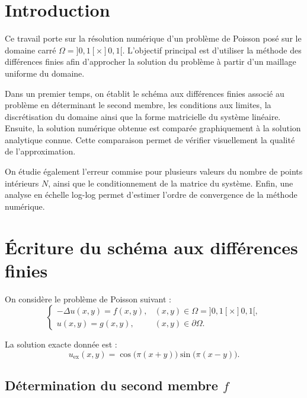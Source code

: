 \documentclass[12pt,a4paper]{article}
\begin{document}
	
	\tableofcontents
	\newpage
	
	\section*{Introduction}
	
	Ce travail porte sur la résolution numérique d'un problème de Poisson posé sur
	le domaine carré $\Omega=]0,1[\times]0,1[$. L'objectif principal est d'utiliser
	la méthode des différences finies afin d'approcher la solution du problème à
	partir d'un maillage uniforme du domaine.
	
	Dans un premier temps, on établit le schéma aux différences finies associé au
	problème en déterminant le second membre, les conditions aux limites, la
	discrétisation du domaine ainsi que la forme matricielle du système linéaire.
	Ensuite, la solution numérique obtenue est comparée graphiquement à la solution
	analytique connue. Cette comparaison permet de vérifier visuellement la qualité
	de l'approximation.
	
	On étudie également l'erreur commise pour plusieurs valeurs du nombre de points
	intérieurs $N$, ainsi que le conditionnement de la matrice du système. Enfin,
	une analyse en échelle log-log permet d'estimer l'ordre de convergence de la
	méthode numérique.
	\newpage
	
	\section{Écriture du schéma aux différences finies}
	
	On considère le problème de Poisson suivant :
	\begin{equation*}
	\begin{cases}
	-\Delta u(x,y)=f(x,y), & (x,y)\in \Omega=]0,1[\times]0,1[,\\
	u(x,y)=g(x,y), & (x,y)\in \partial\Omega.
	\end{cases}
	\end{equation*}
	
	La solution exacte donnée est :
	\begin{equation*}
	u_{\mathrm{ex}}(x,y)
	=
	\cos\bigl(\pi(x+y)\bigr)\sin\bigl(\pi(x-y)\bigr).
	\end{equation*}
	
	\subsection{Détermination du second membre $f$}
	
\end{document}
